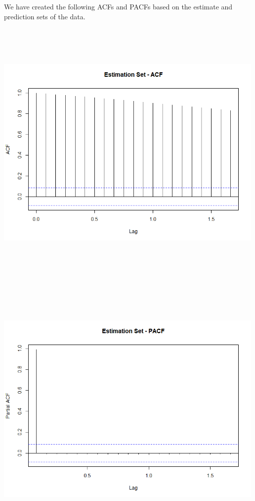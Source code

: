 \documentclass[
]{article}
\begin{document}
We have created the following ACFs and PACFs based on the estimate and
prediction sets of the data.

\includegraphics[width=5.20833in,height=5.20833in]{03_visuals/est_acf.png}

\includegraphics[width=5.20833in,height=5.20833in]{03_visuals/est_pacf.png}
\end{document}
